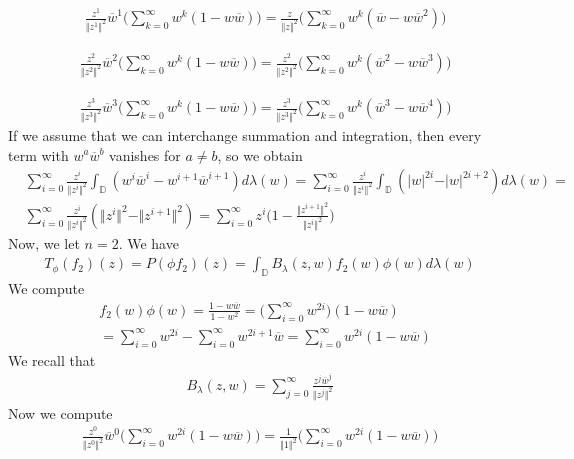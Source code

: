\documentclass[12pt]{article}
\begin{document}
\begin{align*}
&\frac{z^1}{\Vert z^1 \Vert^2} \overline{w}^1 \Bigg( \sum_{k=0}^\infty w^k(1- w\overline{w}) \Bigg)= \frac{z}{\Vert z \Vert^2} \Bigg( \sum_{k=0}^\infty w^k(\overline{w}- w\overline{w}^2) \Bigg)
\end{align*}

\begin{align*}
&\frac{z^2}{\Vert z^2 \Vert^2} \overline{w}^2 \Bigg( \sum_{k=0}^\infty w^k(1- w\overline{w}) \Bigg)= \frac{z^2}{\Vert z^2 \Vert^2} \Bigg( \sum_{k=0}^\infty w^k(\overline{w}^2- w\overline{w}^3) \Bigg)
\end{align*}

\begin{align*}
&\frac{z^3}{\Vert z^3 \Vert^2} \overline{w}^3 \Bigg( \sum_{k=0}^\infty w^k(1- w\overline{w}) \Bigg) = \frac{z^3}{\Vert z^3 \Vert^2} \Bigg( \sum_{k=0}^\infty w^k(\overline{w}^3- w\overline{w}^4) \Bigg)
\end{align*}
If we assume that we can interchange summation and integration, then every term with $w^a\overline{w}^b$ vanishes for $a \neq b$, so we obtain
\begin{align*}
& \sum_{i = 0}^\infty \frac{z^i}{\Vert z^i \Vert^2} \int_\mathbb{D} (w^i\overline{w}^i - w^{i+1}\overline{w}^{i+1}) d\lambda(w) = \sum_{i=0}^\infty \frac{z^i}{\Vert z^i \Vert^2} \int_\mathbb{D} (\vert w\vert^{2i} - \vert w \vert^{2i+2}) d\lambda(w) = \\
& \sum_{i=0}^\infty \frac{z^i}{\Vert z^i \Vert^2} (\Vert z^i \Vert^2 - \Vert z^{i+1} \Vert^2) = \sum_{i=0}^\infty z^i\bigg(1 - \frac{\Vert z^{i+1} \Vert^2}{\Vert z^i \Vert^2}\bigg)
\end{align*} Now, we let $n = 2$. We have
\begin{align*}
T_\phi(f_2)(z) = P(\phi f_2)(z) = \int_\mathbb{D} B_\lambda(z,w) f_2(w) \phi(w) d\lambda(w)
\end{align*} We compute 
\begin{align*}
&f_2(w) \phi(w) = \frac{1 - w\overline{w}}{1-w^2} = \Bigg(\sum_{i=0}^\infty w^{2i}\Bigg)(1 - w \overline{w}) \\
& = \sum_{i=0}^\infty w^{2i} - \sum_{i=0}^\infty w^{2i+1}\overline{w} = \sum_{i=0}^\infty w^{2i}(1-w\overline{w})
\end{align*} We recall that
\begin{align*}
B_\lambda(z,w) = \sum_{j=0}^\infty \frac{z^j \overline{w}^j}{\Vert z^j \Vert^2}
\end{align*} Now we compute
\begin{align*}
\frac{z^0}{\Vert z^0 \Vert^2}\overline{w}^0\Bigg(\sum_{i=0}^\infty w^{2i}(1-w\overline{w})\Bigg) = \frac{1}{\Vert 1 \Vert^2} \Bigg(\sum_{i=0}^\infty w^{2i}(1-w\overline{w})\Bigg)
\end{align*}
\end{document}
